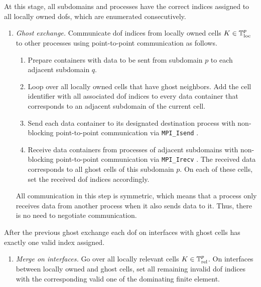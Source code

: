 At this stage, all subdomains and processes have the correct indices assigned to all locally owned \glspl{dof}, which are enumerated consecutively.
\begin{enumerate}[resume]
  \item \textit{Ghost exchange.}
  Communicate \gls{dof} indices from locally owned cells $K \in \mathbb{T}^p_{\text{loc}}$ to other processes using point-to-point communication as follows.
  \begin{enumerate}[label=\alph*.]
    \item Prepare containers with data to be sent from subdomain $p$ to each adjacent subdomain $q$.
    \item Loop over all locally owned cells that have ghost neighbors. Add the cell identifier with all associated \gls{dof} indices to every data container that corresponds to an adjacent subdomain of the current cell.
    \item Send each data container to its designated destination process with non-blocking point-to-point communication via \texttt{MPI\_Isend} \textcite{mpi31}.
    \item Receive data containers from processes of adjacent subdomains with non-blocking point-to-point communication via \texttt{MPI\_Irecv} \textcite{mpi31}. The received data corresponds to all ghost cells of this subdomain $p$. On each of these cells, set the received \gls{dof} indices accordingly.
  \end{enumerate}
  All communication in this step is symmetric, which means that a process only receives data from another process when it also sends data to it. Thus, there is no need to negotiate communication.
\end{enumerate}
After the previous ghost exchange each \gls{dof} on interfaces with ghost cells has exactly one valid index assigned.
\begin{enumerate}[resume]
  \item \textit{Merge on interfaces.}
  Go over all locally relevant cells $K \in \mathbb{T}^p_{\text{rel}}$. On interfaces between locally owned and ghost cells, set all remaining invalid \gls{dof} indices with the corresponding valid one of the dominating finite element.
\end{enumerate}
